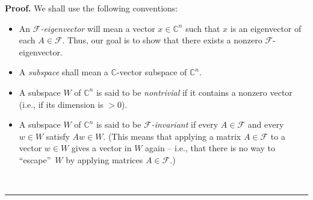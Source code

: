 \documentclass[numbers=enddot,12pt,final,onecolumn,notitlepage]{scrartcl}%
\numberwithin{exer}{subsection}
\theoremstyle{definition}
\newenvironment{proof}[1][Proof]{\noindent\textbf{#1.} }{\ \rule{0.5em}{0.5em}}
\begin{document}
\begin{proof}
We shall use the following conventions:

\begin{itemize}
\item An $\mathcal{F}$\emph{-eigenvector} will mean a vector $x\in
\mathbb{C}^{n}$ such that $x$ is an eigenvector of each $A\in\mathcal{F}$.
Thus, our goal is to show that there exists a nonzero $\mathcal{F}$-eigenvector.

\item A \emph{subspace} shall mean a $\mathbb{C}$-vector subspace of
$\mathbb{C}^{n}$.

\item A subspace $W$ of $\mathbb{C}^{n}$ is said to be \emph{nontrivial} if it
contains a nonzero vector (i.e., if its dimension is $>0$).

\item A subspace $W$ of $\mathbb{C}^{n}$ is said to be $\mathcal{F}%
$\emph{-invariant} if every $A\in\mathcal{F}$ and every $w\in W$ satisfy
$Aw\in W$. (This means that applying a matrix $A\in\mathcal{F}$ to a vector
$w\in W$ gives a vector in $W$ again -- i.e., that there is no way to
\textquotedblleft escape\textquotedblright\ $W$ by applying matrices
$A\in\mathcal{F}$.)


\end{itemize}
\end{proof}
\end{document}

